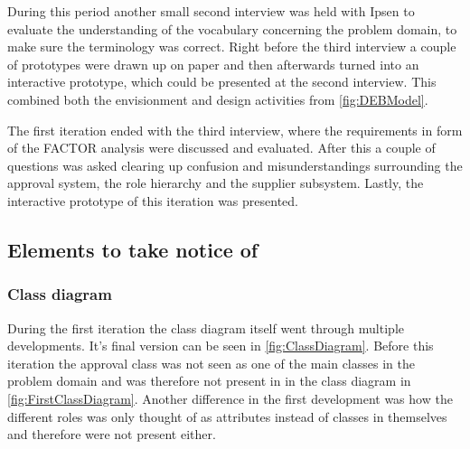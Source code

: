During this period another small second interview was held with Ipsen to evaluate the understanding of the vocabulary concerning the problem domain, to make sure the terminology was correct.
Right before the third interview a couple of prototypes were drawn up on paper and then afterwards turned into an interactive prototype, which could be presented at the second interview.
This combined both the envisionment and design activities from \cref{fig:DEBModel}.

The first iteration ended with the third interview, where the requirements in form of the FACTOR analysis were discussed and evaluated.
After this a couple of questions was asked clearing up confusion and misunderstandings surrounding the approval system, the role hierarchy and the supplier subsystem.
Lastly, the interactive prototype of this iteration was presented.

\subsection{Elements to take notice of}
\subsubsection*{Class diagram}
During the first iteration the class diagram itself went through multiple developments.
It's final version can be seen in \cref{fig:ClassDiagram}.
Before this iteration the approval class was not seen as one of the main classes in the problem domain and was therefore not present in in the class diagram in \cref{fig:FirstClassDiagram}.
Another difference in the first development was how the different roles was only thought of as attributes instead of classes in themselves and therefore were not present either.

